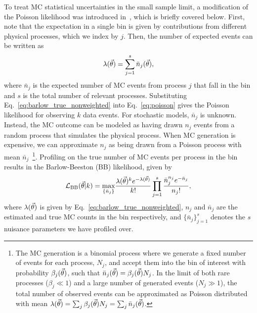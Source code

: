 To treat MC statistical uncertainties in the small sample limit, a modification of the Poisson likelihood was introduced in~\cite{Barlow:1993dm}, which is briefly covered below.
First, note that the expectation in a single bin is given by contributions from different physical processes, which we index by $j$.
Then, the number of expected events can be written as
\begin{equation}
\lambda(\vec{\theta}) = \sum_{j=1}^s \bar n_{j}(\vec{\theta}),
\label{eq:barlow_true_nonweighted}
\end{equation}
where $\bar n_{j}$ is the expected number of MC events from process $j$ that fall in the bin and $s$ is the total number of relevant processes.
Substituting Eq.~\eqref{eq:barlow_true_nonweighted} into Eq.~\eqref{eq:poisson} gives the Poisson likelihood for observing $k$ data events.
For stochastic models, $\bar n_j$ is unknown.
Instead, the MC outcome can be modeled as having drawn $n_j$ events from a random process that simulates the physical process.
When MC generation is expensive, we can approximate $n_j$ as being drawn from a Poisson process with mean $\bar{n}_j$~\footnote{The MC generation is a binomial process where we generate a fixed number of events for each process, $N_j$, and accept them into the bin of interest with probability $\beta_{j}(\vec{\theta})$, such that $\bar n_{j}(\vec{\theta})=\beta_{j}(\vec{\theta}) N_j$.
In the limit of both rare processes ($\beta_{j} \ll 1$) and a large number of generated events ($N_j \gg 1$), the total number of observed events can be approximated as Poisson distributed with mean $\lambda(\vec{\theta}) = \sum_j\beta_{j}(\vec{\theta}) N_j = \sum_j\bar n_{j}(\vec{\theta})$.}.
Profiling on the true number of MC events per process in the bin results in the Barlow-Beeston (BB) likelihood, given by~\cite{Barlow:1993dm}
\begin{equation}
\mathcal{L}_{\textmd{BB}}(\vec{\theta}|k) = \underset{\{\bar n_j\}}{\rm max}
\frac{\lambda(\vec{\theta})^{k}e^{-\lambda(\vec{\theta})}}{k!} \prod_{j=1}^s \frac{\bar n_j^{n_j}e^{-\bar n_j}}{n_j!},
\label{eq:barlow_likelihood_nonweighted}
\end{equation}
where $\lambda(\vec{\theta})$ is given by Eq.~\eqref{eq:barlow_true_nonweighted}, $n_{j}$ and $\bar{n}_{j}$ are the estimated and true MC counts in the bin respectively, and $\{\bar{n}_j\}_{j=1}^{s}$ denotes the $s$ nuisance parameters we have profiled over.

